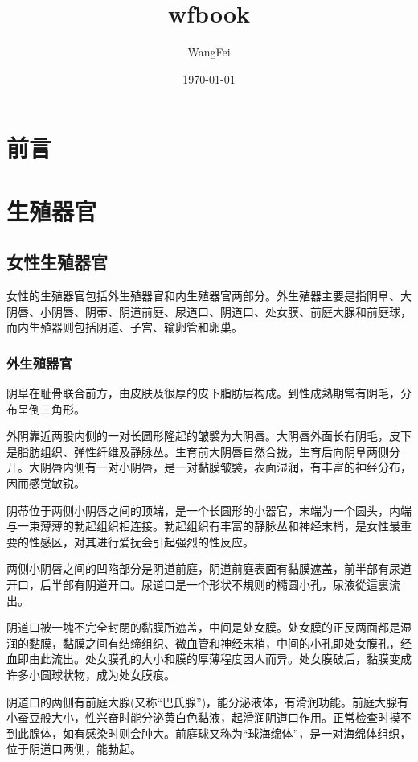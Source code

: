\documentclass[12pt,UTF8]{ctexbook}
\title{\heiti\zihao{0} wfbook}
\author{WangFei}
\date{\today}
\begin{document}
\maketitle
\tableofcontents

\frontmatter

\chapter{前言}



\mainmatter

\chapter{生殖器官}

\section{女性生殖器官}

女性的生殖器官包括外生殖器官和内生殖器官两部分。外生殖器主要是指阴阜、大阴唇、小阴唇、阴蒂、阴道前庭、尿道口、阴道口、处女膜、前庭大腺和前庭球，而内生殖器则包括阴道、子宫、输卵管和卵巢。

\subsection{外生殖器官}

阴阜在耻骨联合前方，由皮肤及很厚的皮下脂肪层构成。到性成熟期常有阴毛，分布呈倒三角形。

外阴靠近两股内侧的一对长圆形隆起的皱襞为大阴唇。大阴唇外面长有阴毛，皮下是脂肪组织、弹性纤维及静脉丛。生育前大阴唇自然合拢，生育后向阴阜两侧分开。大阴唇内侧有一对小阴唇，是一对黏膜皱襞，表面湿润，有丰富的神经分布，因而感觉敏锐。

阴蒂位于两侧小阴唇之间的顶端，是一个长圆形的小器官，末端为一个圆头，内端与一束薄薄的勃起组织相连接。勃起组织有丰富的静脉丛和神经末梢，是女性最重要的性感区，对其进行爱抚会引起强烈的性反应。

两侧小阴唇之间的凹陷部分是阴道前庭，阴道前庭表面有黏膜遮盖，前半部有尿道开口，后半部有阴道开口。尿道口是一个形状不規则的橢圆小孔，尿液從這裏流出。

阴道口被一塊不完全封閉的黏膜所遮盖，中间是处女膜。处女膜的正反两面都是湿润的黏膜，黏膜之间有结缔组织、微血管和神经末梢，中间的小孔即处女膜孔，经血即由此流出。处女膜孔的大小和膜的厚薄程度因人而异。处女膜破后，黏膜变成许多小圆球状物，成为处女膜痕。

阴道口的两侧有前庭大腺(又称“巴氏腺”)，能分泌液体，有滑润功能。前庭大腺有小蚕豆般大小，性兴奋时能分泌黄白色黏液，起滑润阴道口作用。正常检查时摸不到此腺体，如有感染时则会肿大。前庭球又称为“球海绵体”，是一对海绵体组织，位于阴道口两侧，能勃起。
\end{document}
